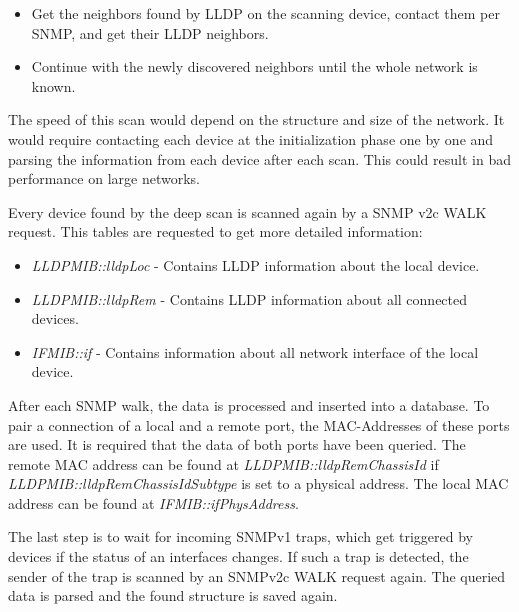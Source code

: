 \begin{minipage}{\textwidth}
\begin{itemize}
    \item Get the neighbors found by LLDP on the scanning device, contact them per SNMP, and get their LLDP neighbors.
    \item Continue with the newly discovered neighbors until the whole network is known.
\end{itemize}
\end{minipage}

The speed of this scan would depend on the structure and size of the network. It would require contacting each device at the initialization phase one by one and parsing the information from each device after each scan. This could result in bad performance on large networks.

Every device found by the deep scan is scanned again by a SNMP v2c WALK request. This tables are requested to get more detailed information:

\begin{minipage}{\textwidth}
\begin{itemize}
    \item \textit{LLDPMIB::lldpLoc} - Contains LLDP information about the local device.
    \item \textit{LLDPMIB::lldpRem} - Contains LLDP information about all connected devices.
    \item \textit{IFMIB::if} - Contains information about all network interface of the local device.
\end{itemize}
\end{minipage}

After each SNMP walk, the data is processed and inserted into a database. To pair a connection of a local and a remote port, the MAC-Addresses of these ports are used. It is required that the data of both ports have been queried. The remote MAC address can be found at \textit{LLDPMIB::lldpRemChassisId} if \textit{LLDPMIB::lldpRemChassisIdSubtype} is set to a physical address. The local MAC address can be found at \textit{IFMIB::ifPhysAddress}.

The last step is to wait for incoming SNMPv1 traps, which get triggered by devices if the status of an interfaces changes. If such a trap is detected, the sender of the trap is scanned by an SNMPv2c WALK request again. The queried data is parsed and the found structure is saved again.